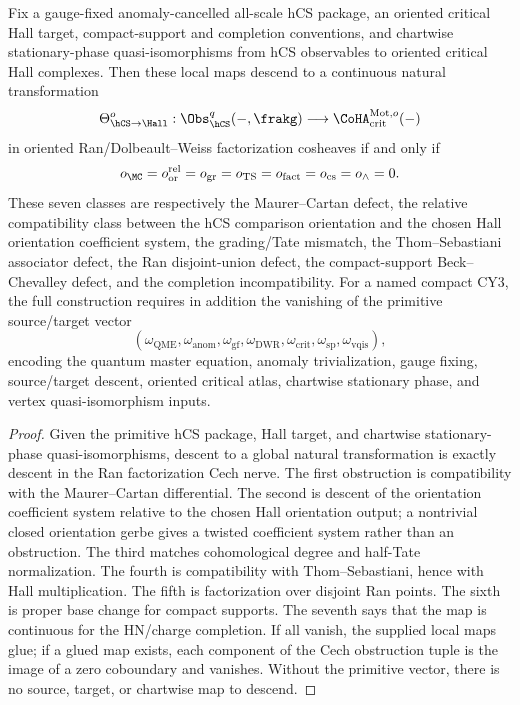 \begin{theorem}
\label{thm:bps-positive-hcs-seven-obstructions}
Fix a gauge-fixed anomaly-cancelled all-scale hCS package, an oriented
critical Hall target, compact-support and completion conventions, and
chartwise stationary-phase quasi-isomorphisms from hCS observables to
oriented critical Hall complexes. Then these local maps descend to a
continuous natural transformation
\[
\Theta^{o}_{\hCS\to\Hall}:
\Obs^{q}_{\hCS}(-,\frakg)
\longrightarrow
\CoHA^{\Mot,o}_{\mathrm{crit}}(-)
\]
in oriented Ran/Dolbeault--Weiss factorization cosheaves if and only if
\[
o_{\MC}=o_{\mathrm{or}}^{\mathrm{rel}}=o_{\mathrm{gr}}=o_{\mathrm{TS}}
=o_{\mathrm{fact}}=o_{\mathrm{cs}}=o_{\wedge}=0.
\]
These seven classes are respectively the Maurer--Cartan defect, the
relative compatibility class between the hCS comparison orientation and
the chosen Hall orientation coefficient system, the grading/Tate
mismatch, the Thom--Sebastiani associator defect, the Ran
disjoint-union defect, the compact-support Beck--Chevalley defect, and
the completion incompatibility. For a named compact CY3, the full construction
requires in addition the vanishing of the primitive source/target vector
\[
(\omega_{\mathrm{QME}},\omega_{\mathrm{anom}},\omega_{\mathrm{gf}},
 \omega_{\mathrm{DWR}},\omega_{\mathrm{crit}},
 \omega_{\mathrm{sp}},\omega_{\mathrm{vqis}}),
\]
encoding the quantum master equation, anomaly trivialization, gauge
fixing, source/target descent, oriented critical atlas, chartwise
stationary phase, and vertex quasi-isomorphism inputs.
\end{theorem}

\begin{proof}
Given the primitive hCS package, Hall target, and chartwise
stationary-phase quasi-isomorphisms, descent to a global natural
transformation is exactly descent in the Ran factorization Cech nerve.
The first obstruction is compatibility with the Maurer--Cartan
differential. The second is descent of the orientation coefficient
system relative to the chosen Hall orientation output; a nontrivial
closed orientation gerbe gives a twisted coefficient system rather than
an obstruction. The third matches cohomological degree and half-Tate
normalization. The fourth is compatibility with Thom--Sebastiani,
hence with Hall multiplication. The fifth is factorization over
disjoint Ran points. The sixth is proper base change for compact
supports. The seventh says that the map is continuous for the
HN/charge completion. If all vanish, the supplied local maps glue; if
a glued map exists, each component of the Cech obstruction tuple is the
image of a zero coboundary and vanishes. Without the primitive vector,
there is no source, target, or chartwise map to descend.
\end{proof}

